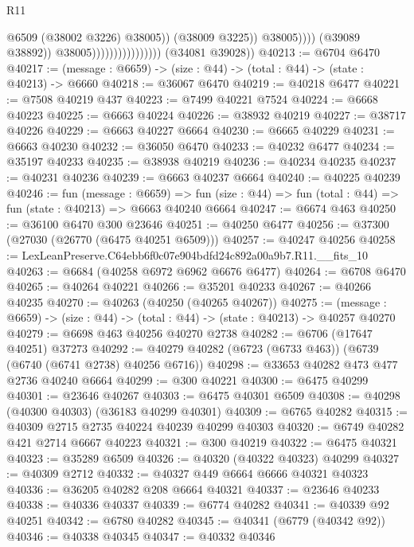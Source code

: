 \begin{lexlean}{R11}
\begin{coremodule}
                                                      @6509
                                                      (@38002 @3226)
                                                      @38005))
                                                  (@38009 @3225))
                                                @38005))))
                                        (@39089 @38892))
                                      @38005))))))))))))))))
      (@34081 @39028))
@40213 := @6704 @6470
@40217 := (message : @6659) -> (size : @44) -> (total : @44) -> (state : @40213) -> @6660
@40218 := @36067 @6470
@40219 := @40218 @6477
@40221 := @7508 @40219 @437
@40223 := @7499 @40221 @7524
@40224 := @6668 @40223
@40225 := @6663 @40224
@40226 := @38932 @40219
@40227 := @38717 @40226
@40229 := @6663 @40227 @6664
@40230 := @6665 @40229
@40231 := @6663 @40230
@40232 := @36050 @6470
@40233 := @40232 @6477
@40234 := @35197 @40233
@40235 := @38938 @40219
@40236 := @40234 @40235
@40237 := @40231 @40236
@40239 := @6663 @40237 @6664
@40240 := @40225 @40239
@40246 := fun (message : @6659) =>
  fun (size : @44) => fun (total : @44) => fun (state : @40213) => @6663 @40240 @6664
@40247 := @6674 @463
@40250 := @36100 @6470 @300 @23646
@40251 := @40250 @6477
@40256 := @37300 (@27030 (@26770 (@6475 @40251 @6509)))
@40257 := @40247 @40256
@40258 := LexLeanPreserve.C64ebb6f0c07e904bdfd24c892a00a9b7.R11.__fits_10
@40263 := @6684 (@40258 @6972 @6962 @6676 @6477)
@40264 := @6708 @6470
@40265 := @40264 @40221
@40266 := @35201 @40233
@40267 := @40266 @40235
@40270 := @40263 (@40250 (@40265 @40267))
@40275 := (message : @6659) -> (size : @44) -> (total : @44) -> (state : @40213) -> @40257 @40270
@40279 := @6698 @463 @40256 @40270 @2738
@40282 := @6706 (@17647 @40251) @37273
@40292 := @40279 @40282 (@6723 (@6733 @463)) (@6739 (@6740 (@6741 @2738) @40256 @6716))
@40298 := @33653 @40282 @473 @477 @2736 @40240 @6664
@40299 := @300 @40221
@40300 := @6475 @40299
@40301 := @23646 @40267
@40303 := @6475 @40301 @6509
@40308 := @40298 (@40300 @40303) (@36183 @40299 @40301)
@40309 := @6765 @40282
@40315 := @40309 @2715 @2735 @40224 @40239 @40299 @40303
@40320 := @6749 @40282 @421 @2714 @6667 @40223
@40321 := @300 @40219
@40322 := @6475 @40321
@40323 := @35289 @6509
@40326 := @40320 (@40322 @40323) @40299
@40327 := @40309 @2712
@40332 := @40327 @449 @6664 @6666 @40321 @40323
@40336 := @36205 @40282 @208 @6664 @40321
@40337 := @23646 @40233
@40338 := @40336 @40337
@40339 := @6774 @40282
@40341 := @40339 @92 @40251
@40342 := @6780 @40282
@40345 := @40341 (@6779 (@40342 @92))
@40346 := @40338 @40345
@40347 := @40332 @40346

\end{coremodule}
\end{lexlean}
